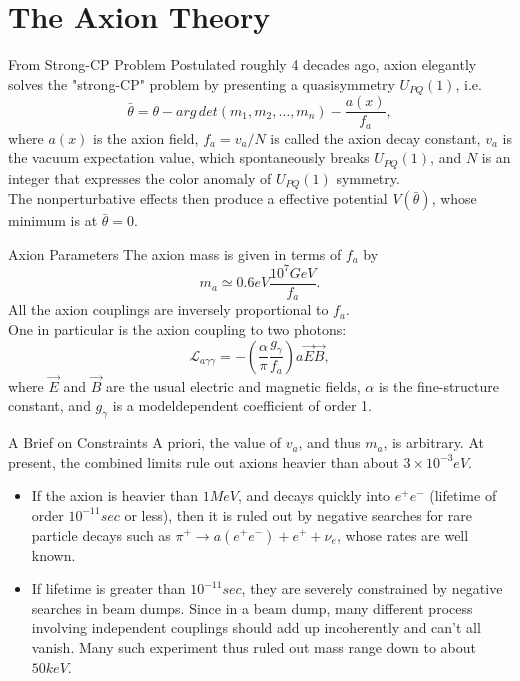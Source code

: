 \documentclass{beamer}
\begin{document}
\section{The Axion Theory}
\begin{frame}{From Strong-CP Problem}
Postulated roughly 4 decades ago, axion elegantly solves the "strong-CP" problem by presenting a quasisymmetry $U_{PQ}(1)$, i.e.
$$\bar{\theta} = \theta - arg \, det(m_1,m_2, \ldots, m_n) - \frac{a(x)}{f_a},$$
where $a(x)$ is the axion field, $f_a = v_a/N$ is called the axion decay constant, $v_a$ is the vacuum expectation value,
which spontaneously breaks $U_{PQ}(1)$, and $N$ is an integer that expresses the color anomaly of $U_{PQ}(1)$ symmetry.
\\
\vspace{1cm}
The nonperturbative effects then produce a effective potential $V(\bar{\theta})$, whose minimum is at $\bar{\theta} = 0$.
\end{frame}
\begin{frame}{Axion Parameters}
The axion mass is given in terms of $f_a$ by$$
m_a \simeq 0.6 eV \frac{10^7GeV}{f_a}.$$
All the axion couplings are inversely proportional to $f_a$.
\\One in particular is the axion coupling to two
photons:$$
\mathcal{L}_{a \gamma \gamma} = -(\frac{\alpha}{\pi} \frac{g_{\gamma}}{f_a}) a \vec{E} \vec{B},$$
where $\vec{E}$ and $\vec{B}$ are the usual electric and magnetic
fields, $\alpha$ is the fine-structure constant, and $g_{\gamma}$
is a modeldependent coefficient of order 1.
\end{frame}
\begin{frame}{A Brief on Constraints}
A priori, the value of $v_a$, and thus $m_a$, is arbitrary. At present, the combined limits rule out axions heavier than about $3 \times 10^{-3}eV$.
\begin{itemize}
\item If the axion is heavier than $1 MeV$, and decays quickly into $e^+ e^-$ (lifetime of order $10^{-11} sec$ or less), then it is ruled out by negative searches for rare particle decays such as $\pi^+ \rightarrow a(e^+ e^-)+e^++\nu_e$, whose rates are well known.
\item If lifetime is greater than $10^{-11} sec$, they are severely constrained by negative searches in beam dumps. Since in a beam dump, many different process involving independent couplings should add up incoherently and can't all vanish. Many such experiment thus ruled out mass range down to about $50 keV$.
\end{itemize}
\end{frame}
\end{document}
